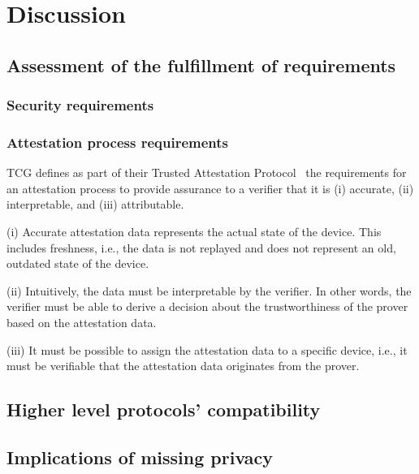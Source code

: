 
\chapter{Discussion}\label{chapter:discussion}

\section{Assessment of the fulfillment of requirements}

\subsection{Security requirements}

\subsection{Attestation process requirements}


\ac{TCG} defines as part of their Trusted Attestation Protocol~\cite{tap} the requirements for an attestation process to provide assurance to a verifier that it is (i) accurate, (ii) interpretable, and (iii) attributable.

(i) Accurate attestation data represents the actual state of the device.
This includes freshness, i.e., the data is not replayed and does not represent an old, outdated state of the device.

(ii) Intuitively, the data must be interpretable by the verifier.
In other words, the verifier must be able to derive a decision about the trustworthiness of the prover based on the attestation data.

(iii) It must be possible to assign the attestation data to a specific device, i.e., it must be verifiable that the attestation data originates from the prover.


\section{Higher level protocols' compatibility}

\section{Implications of missing privacy}

